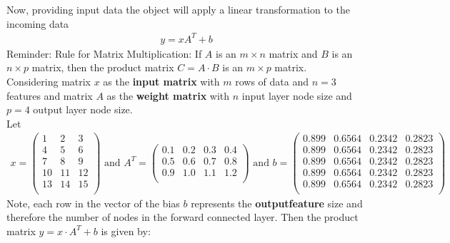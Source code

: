 Now, providing input data the object will apply a linear transformation to the incoming data
\begin{align}
	y = xA^T + b
\end{align}
Reminder: Rule for Matrix Multiplication:
If  $A$ is an  $m \times n$ matrix and $B$ is an $n \times p$ matrix, then the product matrix  $C = A \cdot B$ is an  $m \times p$ matrix.\\

Considering matrix $x$ as the \textbf{input matrix} with  $m$ rows of data and $n=3$ features and matrix $A$ as the \textbf{weight matrix} with $n$ input layer node size and $p=4$ output layer node size.\\

Let
\begin{align} 
x = \begin{pmatrix}
1 & 2 & 3 \\
4 & 5 & 6 \\
7 & 8 & 9 \\
10 & 11 & 12 \\
13 & 14 & 15 \\
\end{pmatrix}
\text{ and }
A^T = \begin{pmatrix}
0.1 & 0.2 & 0.3 & 0.4 \\
0.5 & 0.6 & 0.7 & 0.8 \\
0.9 & 1.0 & 1.1 & 1.2 \\
\end{pmatrix}\text{ and } b= \begin{pmatrix}
	0.899 & 0.6564 & 0.2342 & 0.2823\\
	0.899 & 0.6564 & 0.2342 & 0.2823\\
	0.899 & 0.6564 & 0.2342 & 0.2823\\
	0.899 & 0.6564 & 0.2342 & 0.2823\\
	0.899 & 0.6564 & 0.2342 & 0.2823\\
\end{pmatrix}
\end{align}
Note, each row in the vector of the bias $b$ represents the \textbf{outputfeature} size and therefore the number of nodes in the forward connected layer. 
Then the product matrix $y = x \cdot A^T + b$ is given by:


